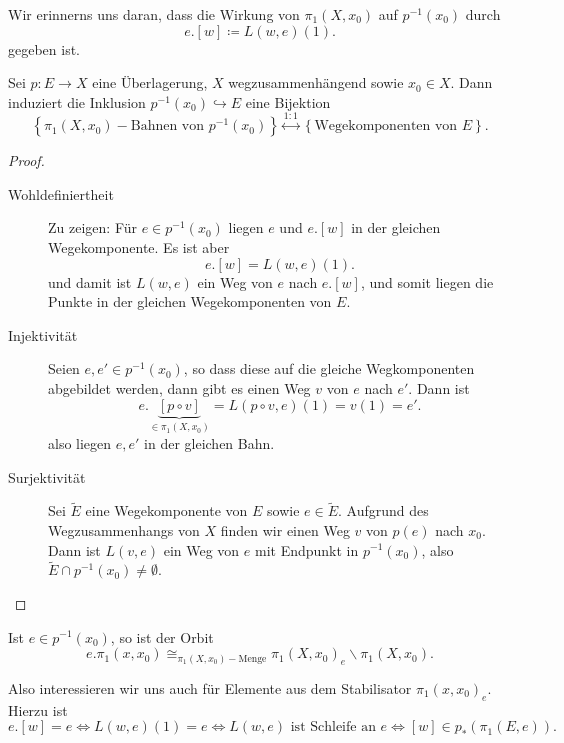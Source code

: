 
Wir erinnerns uns daran, dass die Wirkung von $\pi_1(X,x_0)$ auf $p^{-1} (x_0)$ durch
\[
    e.[w] \coloneqq  L(w,e)(1)
.\] 
gegeben ist.

\begin{proposition}
    Sei $p\colon E\to X$ eine Überlagerung,  $X$ wegzusammenhängend sowie  $x_0\in X$. Dann induziert die Inklusion $p^{-1} (x_0) \hookrightarrow E$ eine Bijektion
    \[
        \left \{\pi_1(X,x_0) - \text{Bahnen von } p^{-1} (x_0) \right\}  \stackrel{1:1}{\longleftrightarrow} \left \{\text{Wegekomponenten von } E\right\} 
    .\] 
\end{proposition}

\begin{proof}
    \begin{description}
        \item[Wohldefiniertheit] Zu zeigen: Für $e\in p^{-1} (x_0)$ liegen $e$ und  $e.[w]$ in der gleichen Wegekomponente. Es ist aber
             \[
                 e.[w] = L(w,e)(1)
            .\] 
            und damit ist $L(w,e)$ ein Weg von  $e$ nach  $e.[w]$, und somit liegen die Punkte in der gleichen Wegekomponenten von  $E$.
        \item[Injektivität] Seien  $e,e'\in p^{-1} (x_0)$, so dass diese auf die gleiche Wegkomponenten abgebildet werden, dann gibt es einen Weg $v$ von  $e$ nach  $e'$. Dann ist
             \[
                 e.\underbrace{[p \circ  v]}_{\in \pi_1(X,x_0)}  = L(p \circ  v, e)(1) = v(1) = e'
            .\] 
            also liegen $e,e'$ in der gleichen Bahn.
        \item[Surjektivität] Sei  $\tilde{E}$ eine Wegekomponente von $E$ sowie  $e\in \tilde{E}$. Aufgrund des Wegzusammenhangs von $X$ finden wir einen Weg  $v$ von  $p(e)$ nach  $x_0$. Dann ist $L(v,e)$ ein Weg von  $e$ mit Endpunkt in  $p^{-1} (x_0)$, also $\tilde{E} \cap  p^{-1} (x_0) \neq  \emptyset$.
    \end{description}
\end{proof}

Ist $e\in p^{-1} (x_0)$, so ist der Orbit
\[
    e.\pi_1(x,x_0) \cong_{\pi_1(X,x_0)-\text{Menge}} \pi_1(X,x_0)_e \backslash \pi_1(X,x_0)
.\] 

Also interessieren wir uns auch für Elemente aus dem Stabilisator $\pi_1(x,x_0)_e$. Hierzu ist
\[
    e.[w] = e \iff  L(w,e)(1) = e \iff  L(w,e) \text{ ist Schleife an } e \iff  [w] \in  p_*(\pi_1(E,e))
.\] 

